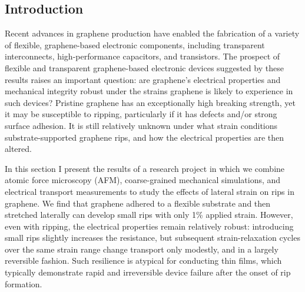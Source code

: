 \documentclass[edeposit,fullpage,draftthesis]{uiucthesis2009}
\begin{document}
    \subsection{Introduction}
    
        Recent advances in graphene production\cite{Kim2009, Bae2010, Lee2010} have
        enabled the fabrication of a variety of flexible, graphene-based electronic
        components, including transparent interconnects\cite{Kim2011}, high-performance
        capacitors\cite{El-Kady2012}, and transistors\cite{Lee2011}. The prospect of
        flexible and transparent graphene-based electronic devices suggested by these
        results raises an important question: are graphene's electrical properties and
        mechanical integrity robust under the strains graphene is likely to experience
        in such devices? Pristine graphene has an exceptionally high breaking
        strength\cite{Lee2008}, yet it may be susceptible to ripping, particularly if
        it has defects \cite{Kim2012} and/or strong  surface adhesion\cite{Sen2010}. It
        is still relatively unknown under what strain conditions substrate-supported
        graphene rips, and how the electrical properties are then altered.
        
        
        In this section I present the results of a research project in which 
        we combine atomic force microscopy (AFM), coarse-grained
        mechanical simulations, and electrical transport measurements to study the
        effects of lateral strain on rips in graphene. We find that graphene adhered to
        a flexible substrate and then stretched laterally can develop small rips with
        only 1\% applied strain. However, even with ripping, the electrical properties
        remain relatively robust: introducing small rips slightly increases the
        resistance, but subsequent strain-relaxation cycles over the same strain range
        change transport only modestly, and in a largely reversible fashion. Such
        resilience is atypical for conducting thin films, which typically demonstrate
        rapid and irreversible device failure after the onset of rip
        formation\cite{Cairns2000,Fortunato2002}.
    
\end{document}
